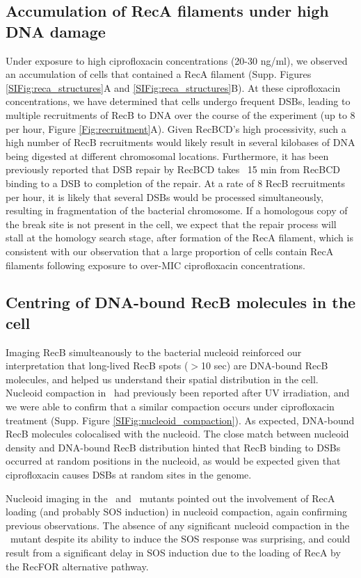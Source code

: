 \subsection*{Accumulation of RecA filaments under high DNA damage}
Under exposure to high ciprofloxacin concentrations (20-30 ng/ml), we observed an accumulation of cells that contained a RecA filament (Supp. Figures \ref{SIFig:reca_structures}A and \ref{SIFig:reca_structures}B). At these ciprofloxacin concentrations, we have determined that cells undergo frequent DSBs, leading to multiple recruitments of RecB to DNA over the course of the experiment (up to 8 per hour, Figure \ref{Fig:recruitment}A). Given RecBCD's high processivity\cite{Wiktor2018}, such a high number of RecB recruitments would likely result in several kilobases of DNA being digested at different chromosomal locations. Furthermore, it has been previously reported that DSB repair by RecBCD takes ~15 min from RecBCD binding to a DSB to completion of the repair\cite{Wiktor2021}. At a rate of 8 RecB recruitments per hour, it is likely that several DSBs would be processed simultaneously, resulting in fragmentation of the bacterial chromosome. If a homologous copy of the break site is not present in the cell, we expect that the repair process will stall at the homology search stage, after formation of the RecA filament, which is consistent with our observation that a large proportion of cells contain RecA filaments following exposure to over-MIC ciprofloxacin concentrations.

\subsection*{Centring of DNA-bound RecB molecules in the cell}
Imaging RecB simulteanously to the bacterial nucleoid reinforced our interpretation that long-lived RecB spots ($>$10 sec) are DNA-bound RecB molecules, and helped us understand their spatial distribution in the cell. Nucleoid compaction in \ecoli\ had previously been reported after UV irradiation\cite{Odsbu2014}, and we were able to confirm that a similar compaction occurs under ciprofloxacin treatment (Supp. Figure \ref{SIFig:nucleoid_compaction}). As expected, DNA-bound RecB molecules colocalised with the nucleoid. The close match between nucleoid density and DNA-bound RecB distribution hinted that RecB binding to DSBs occurred at random positions in the nucleoid, as would be expected given that ciprofloxacin causes DSBs at random sites in the genome.

Nucleoid imaging in the \dreca\ and \geneteneighty\ mutants pointed out the involvement of RecA loading (and probably SOS induction) in nucleoid compaction, again confirming previous observations\cite{Odsbu2014}. The absence of any significant nucleoid compaction in the \geneteneighty\ mutant despite its ability to induce the SOS response was surprising, and could result from a significant delay in SOS induction due to the loading of RecA by the RecFOR alternative pathway.
